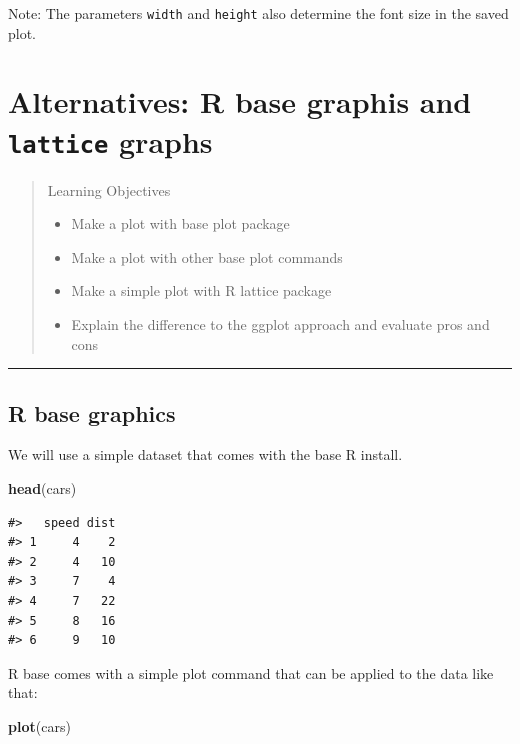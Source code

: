 \documentclass[]{book}
\newenvironment{Shaded}{\begin{snugshade}}{\end{snugshade}}
\newcommand{\KeywordTok}[1]{\textcolor[rgb]{0.13,0.29,0.53}{\textbf{#1}}}
\newcommand{\NormalTok}[1]{#1}
\providecommand{\tightlist}{%
  \setlength{\itemsep}{0pt}\setlength{\parskip}{0pt}}
\theoremstyle{definition}
\theoremstyle{definition}
\theoremstyle{definition}
\theoremstyle{remark}
\begin{document}
Note: The parameters \texttt{width} and \texttt{height} also determine
the font size in the saved plot.

\chapter{\texorpdfstring{Alternatives: R base graphis and
\texttt{lattice}
graphs}{Alternatives: R base graphis and lattice graphs}}\label{baseplot}

\begin{quote}
Learning Objectives

\begin{itemize}
\tightlist
\item
  Make a plot with base plot package
\item
  Make a plot with other base plot commands
\item
  Make a simple plot with R lattice package
\item
  Explain the difference to the ggplot approach and evaluate pros and
  cons
\end{itemize}
\end{quote}

\begin{center}\rule{0.5\linewidth}{\linethickness}\end{center}

\section{R base graphics}\label{r-base-graphics}

We will use a simple dataset that comes with the base R install.

\begin{Shaded}
\begin{Highlighting}[]
\KeywordTok{head}\NormalTok{(cars)}
\end{Highlighting}
\end{Shaded}

\begin{verbatim}
#>   speed dist
#> 1     4    2
#> 2     4   10
#> 3     7    4
#> 4     7   22
#> 5     8   16
#> 6     9   10
\end{verbatim}

R base comes with a simple plot command that can be applied to the data
like that:

\begin{Shaded}
\begin{Highlighting}[]
\KeywordTok{plot}\NormalTok{(cars)}
\end{Highlighting}
\end{Shaded}
\end{document}
